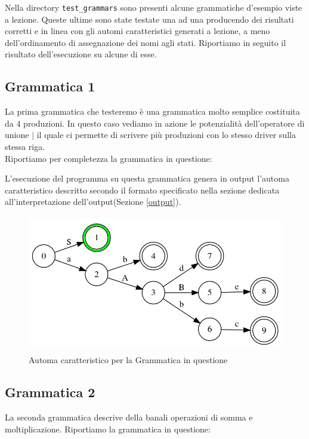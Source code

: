 \documentclass[12pt]{article}
\begin{document}
Nella directory \texttt{test\_grammars} sono presenti alcune grammatiche d'esempio viste a lezione. Queste ultime sono state testate una ad una producendo dei risultati corretti e in linea con gli automi caratteristici generati a lezione, a meno dell'ordinamento di assegnazione dei nomi agli stati. Riportiamo in seguito il risultato dell'esecuzione su alcune di esse.


\subsection{Grammatica 1}
La prima grammatica che testeremo è una grammatica molto semplice costituita da 4 produzioni. In questo caso vediamo in azione le potenzialità dell'operatore di unione $\mid$ il quale ci permette di scrivere più produzioni con lo stesso driver sulla stessa riga. \\

Riportiamo per completezza la grammatica in questione:


L'esecuzione del programma su questa grammatica genera in output l'automa caratteristico descritto secondo il formato specificato nella sezione dedicata all'interpretazione dell'output(Sezione \ref{output}).

\begin{figure}[h]
  \includegraphics[height=6cm, keepaspectratio]{assets/automa1.png}
  \caption{Automa caratteristico per la Grammatica in questione}
  \label{fig:automa1}
\end{figure}

\subsection{Grammatica 2}
La seconda grammatica descrive della banali operazioni di somma e moltiplicazione. Riportiamo la grammatica in questione:

\end{document}

